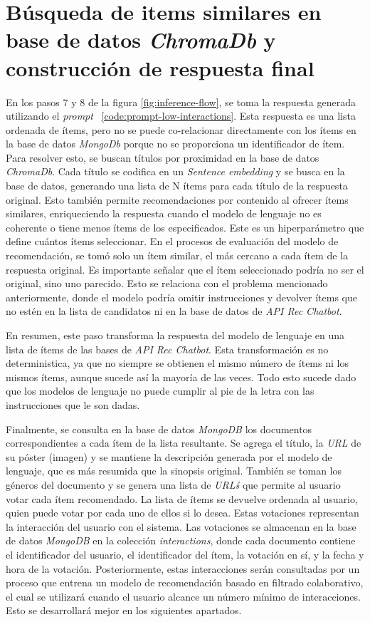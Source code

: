 \documentclass[11pt,a4paper,twoside]{thesis}
\begin{document}
\section{Búsqueda de items similares en base de datos \textit{ChromaDb} y construcción de respuesta final}

En los pasos $7$ y $8$ de la figura \ref{fig:inference-flow}, se toma la respuesta generada utilizando el \textit{prompt} ~\ref{code:prompt-low-interactions}. Esta respuesta es una lista ordenada de ítems, pero no se puede co-relacionar directamente con los ítems en la base de datos \textit{MongoDb} porque no se proporciona un identificador de ítem. Para resolver esto, se buscan títulos por proximidad en la base de datos \textit{ChromaDb}. Cada título se codifica en un \textit{Sentence embedding} y se busca en la base de datos, generando una lista de N ítems para cada título de la respuesta original. Esto también permite recomendaciones por contenido al ofrecer ítems similares, enriqueciendo la respuesta cuando el modelo de lenguaje no es coherente o tiene menos ítems de los especificados. Este es un hiperparámetro que define cuántos ítems seleccionar. En el procesos de evaluación del modelo de recomendación, se tomó solo un ítem similar, el más cercano a cada ítem de la respuesta original. Es importante señalar que el ítem seleccionado podría no ser el original, sino uno parecido. Esto se relaciona con el problema mencionado anteriormente, donde el modelo podría omitir instrucciones y devolver ítems que no estén en la lista de candidatos ni en la base de datos de \textit{API Rec Chatbot}.

En resumen, este paso transforma la respuesta del modelo de lenguaje en una lista de ítems de las bases de \textit{API Rec Chatbot}. Esta transformación es no deterministica, ya que no siempre se obtienen el mismo número de ítems ni los mismos ítems, aunque sucede así la mayoría de las veces. Todo esto sucede dado que los modelos de lenguaje no puede cumplir al pie de la letra con las instrucciones que le son dadas.

Finalmente, se consulta en la base de datos \textit{MongoDB} los documentos correspondientes a cada ítem de la lista resultante. Se agrega el título, la \textit{URL} de su póster (imagen) y se mantiene la descripción generada por el modelo de lenguaje, que es más resumida que la sinopsis original. También se toman los géneros del documento y se genera una lista de \textit{URL\'s} que permite al usuario votar cada ítem recomendado. La lista de ítems se devuelve ordenada al usuario, quien puede votar por cada uno de ellos si lo desea. Estas votaciones representan la interacción del usuario con el sistema. Las votaciones se almacenan en la base de datos \textit{MongoDB} en la colección \textit{interactions}, donde cada documento contiene el identificador del usuario, el identificador del ítem, la votación en sí, y la fecha y hora de la votación. Posteriormente, estas interacciones serán consultadas por un proceso que entrena un modelo de recomendación basado en filtrado colaborativo, el cual se utilizará cuando el usuario alcance un número mínimo de interacciones. Esto se desarrollará mejor en los siguientes apartados.
\vfill
\end{document}
